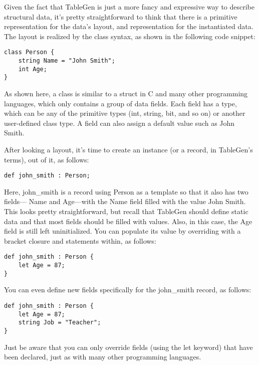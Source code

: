 
Given the fact that TableGen is just a more fancy and expressive way to describe structural data, it's pretty straightforward to think that there is a primitive representation for the data's layout, and representation for the instantiated data. The layout is realized by the class syntax, as shown in the following code snippet:

\begin{lstlisting}[style=styleCXX]
class Person {
	string Name = "John Smith";
	int Age;
}
\end{lstlisting}

As shown here, a class is similar to a struct in C and many other programming languages, which only contains a group of data fields. Each field has a type, which can be any of the primitive types (int, string, bit, and so on) or another user-defined class type. A field can also assign a default value such as John Smith.

After looking a layout, it's time to create an instance (or a record, in TableGen's terms), out of it, as follows:

\begin{lstlisting}[style=styleCXX]
def john_smith : Person;
\end{lstlisting}

Here, john\_smith is a record using Person as a template so that it also has two fields— Name and Age—with the Name field filled with the value John Smith. This looks pretty straightforward, but recall that TableGen should define static data and that most fields should be filled with values. Also, in this case, the Age field is still left uninitialized. You can populate its value by overriding with a bracket closure and statements within, as follows:

\begin{lstlisting}[style=styleCXX]
def john_smith : Person {
	let Age = 87;
}
\end{lstlisting}

You can even define new fields specifically for the john\_smith record, as follows:

\begin{lstlisting}[style=styleCXX]
def john_smith : Person {
	let Age = 87;
	string Job = "Teacher";
}
\end{lstlisting}

Just be aware that you can only override fields (using the let keyword) that have been declared, just as with many other programming languages.

